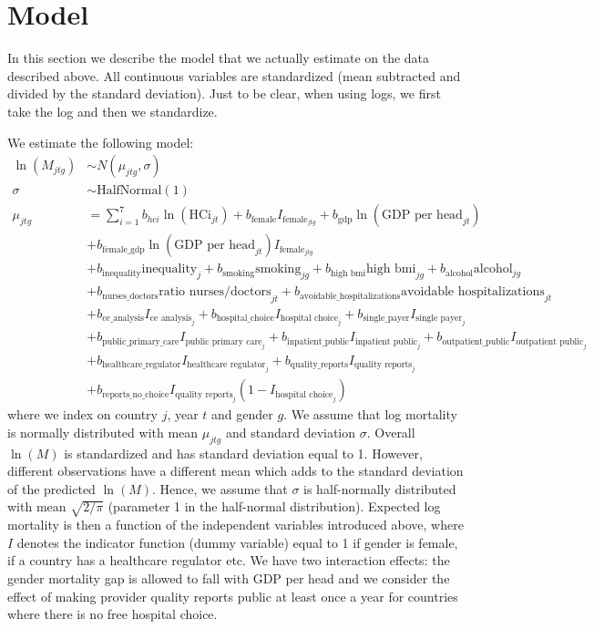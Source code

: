 \documentclass[12pt,english,a4paper]{article}
\begin{document}
\section{Model}
\label{sec:org23d7d34}

In this section we describe the model that we actually estimate on the data described above.  All continuous variables are standardized (mean subtracted and divided by the standard deviation). Just to be clear, when using logs, we first take the log and then we standardize.

We estimate the following model:
\begin{align*}
\ln(M_{jtg}) &\sim N(\mu_{jtg},\sigma) \\
\sigma & \sim\text{HalfNormal}(1) \\
\mu_{jtg} &= \sum_{i=1}^7 b_{hci} \ln(\text{HCi}_{jt}) + b_{\text{female}} I_{\text{female}_{jtg}} + b_{\text{gdp}} \ln(\text{GDP per head}_{jt}) \\
 & + b_{\text{female\_gdp}} \ln(\text{GDP per head}_{jt})  I_{\text{female}_{jtg}} \\
 & + b_{\text{inequality}} \text{inequality}_{j} + b_{\text{smoking}} \text{smoking}_{jg}+ b_{\text{high bmi}} \text{high bmi}_{jg}+ b_{\text{alcohol}} \text{alcohol}_{jg} \\
 & + b_{\text{nurses\_doctors}} \text{ratio nurses/doctors}_{jt} + b_{\text{avoidable\_hospitalizations}} \text{avoidable hospitalizations}_{jt} \\
 & + b_{\text{ce\_analysis}} I_{\text{ce analysis}_{j}} +  b_{\text{hospital\_choice}} I_{\text{hospital choice}_{j}} + b_{\text{single\_payer}} I_{\text{single payer}_{j}} \\
 & +  b_{\text{public\_primary\_care}} I_{\text{public primary care}_j} + b_{\text{inpatient\_public}} I_{\text{inpatient public}_{j}}+ b_{\text{outpatient\_public}} I_{\text{outpatient public}_j} \\
 & + b_{\text{healthcare\_regulator}} I_{\text{healthcare regulator}_j} + b_{\text{quality\_reports}} I_{\text{quality reports}_j} \\
 & + b_{\text{reports\_no\_choice}} I_{\text{quality reports}_j} (1-I_{\text{hospital choice}_j})
\end{align*}
where we index on country \(j\), year \(t\) and gender \(g\). We assume that log mortality is normally distributed with mean \(\mu_{jtg}\) and standard deviation \(\sigma\). Overall \(\ln(M)\) is standardized and has standard deviation equal to 1. However, different observations have a different mean which adds to the standard deviation of the predicted \(\ln(M)\). Hence, we assume that \(\sigma\) is half-normally distributed with mean \(\sqrt{2/\pi}\) (parameter 1 in the half-normal distribution). Expected log mortality is then a function of the independent variables introduced above, where \(I\) denotes the indicator function (dummy variable) equal to 1 if gender is female, if a country has a healthcare regulator etc. We have two interaction effects: the gender mortality gap is allowed to fall with GDP per head and we consider the effect of making provider quality reports public at least once a year for countries where there is no free hospital choice.
\end{document}
